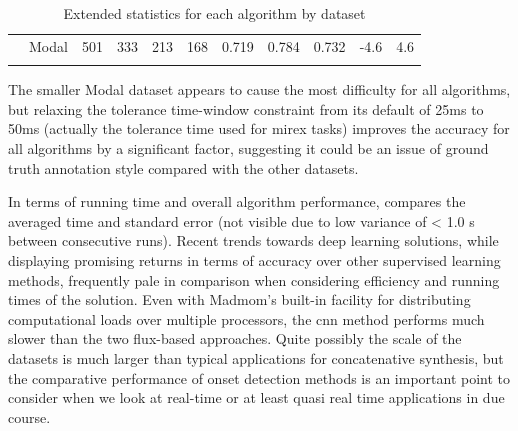 {\begin{table}
\begin{threeparttable}
\begin{centering}
\begin{tabular}{l l l l l l l l l l l}
          & Modal   & 501    & 333   & 213  & 168   & 0.719     & 0.784  & 0.732     & -4.6 & 4.6 \\
				\tablebot		
			\end{tabular}
			\par \end{centering}		
		\begin{tablenotes}
			\small
		\end{tablenotes}
			\caption[Extended statistics for each algorithm by dataset]{Extended statistics for each algorithm by dataset}
			\label{tab:extended_onset_statistics}
	\end{threeparttable}
\end{table}

The smaller Modal dataset appears to cause the most difficulty for all algorithms, but relaxing the tolerance time-window constraint from its default of 25ms to 50ms (actually the tolerance time used for \acrshort{mirex} tasks) improves the accuracy for all algorithms by a significant factor, suggesting it could be an issue of ground truth annotation style compared with the other datasets.

In terms of running time and overall algorithm performance,  compares the averaged time and standard error (not visible due to low variance of < 1.0 s between consecutive runs). Recent trends towards deep learning solutions, while displaying promising returns in terms of accuracy over other supervised learning methods, frequently pale in comparison when considering efficiency and running times of the solution. Even with Madmom's built-in facility for distributing computational loads over multiple processors, the \acrshort{cnn} method performs much slower than the two flux-based approaches. Quite possibly the scale of the datasets is much larger than typical applications for concatenative synthesis, but the comparative performance of onset detection methods is an important point to consider when we look at real-time or at least quasi real time applications in due course.

}
